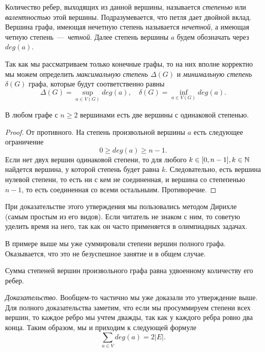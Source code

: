 \begin{definition}
	Количество ребер, выходящих из данной вершины, называется \emph{степенью} или \emph{валентностью} этой вершины. 
	Подразумевается, что петля дает двойной вклад. Вершина графа, имеющая нечетную степень называется \emph{нечетной}, 
	а имеющая четную степень~---~\emph{четной}. Далее степень вершины $a$ будем обозначать через $deg(a)$.
\end{definition}

\begin{definition}
	Так как мы рассматриваем только конечные графы, то на них вполне корректно мы можем определить 
	\emph{максимальную степень $\Delta (G)$} и \emph{минимальную степень $\delta (G)$} графа, которые
	будут соответственно равны
	$$\Delta (G) = \sup_{a \in V(G)} deg (a), \;\ \;\ \delta (G) = \inf_{a \in V(G)} deg (a).$$
\end{definition}

\begin{statement}
	В любом графе с $n \geqslant 2$ вершинами есть две вершины с одинаковой степенью.
	
\begin{proof}
	От противного. На степень произвольной вершины $a$ есть следующее ограничение
	$$0 \geqslant deg (a) \geqslant n-1.$$
	Если нет двух вершин одинаковой степени, то для любого $k \in [0, n-1], k \in \mathbb{N}$ найдется вершина,
	у которой степень будет равна $k$. Следовательно, есть вершина нулевой степени, то есть ни с кем не соединенная,
	и вершина со степепенью $n-1$, то есть соединенная со всеми остальныим. Противоречие.
\end{proof}
\end{statement}

	При доказательстве этого утверждения мы пользовались методом Дирихле (самым простым из его видов). Если читатель не знаком с ним,
	то советую уделить время на него, так как он часто применяется в олимпиадных задачах.

	В примере выше мы уже суммировали степени вершин полного графа. Оказывается, что это не безуспешное занятие и в общем случае.

\begin{lemma}[о рукопожатиях]
	Сумма степеней вершин произвольного графа равна удвоенному количеству его ребер.
	
	\emph{Доказательство.} Вообщем-то частично мы уже доказали это утверждение выше. Для полного доказательства заметим, что если 
	мы просуммируем степени всех вершин, то каждое ребро мы учтем дважды, так как у каждого ребра ровно два конца. 
	Таким образом, мы и приходим к следующей формуле $$\sum_{a \in V} deg(a) = 2|E|.$$
\end{lemma}

